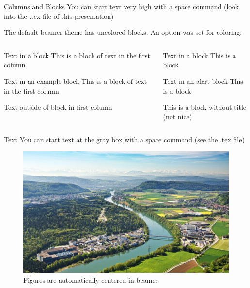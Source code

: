 \documentclass[aspectratio=169]{beamer}
\begin{document}
\begin{frame}{Columns and Blocks}
  You can start text very high with a space command (look into the .tex file of this presentation)

 The default beamer theme has uncolored blocks. An option was set for coloring: 
  \begin{columns}
    \begin{column}[T]{0.6\linewidth}
      \begin{block}{Text in a block}
        This is a block of text in the first column
      \end{block}
      \begin{exampleblock}{Text in an example block}
        This is a block of text in the first column
      \end{exampleblock}
      Text outside of block in first column
    \end{column}
    \begin{column}[T]{0.4\linewidth}
      \begin{block}{Text in a block}
        This is a block 
      \end{block}
      \begin{alertblock}{Text in an alert block}
        This is a block
      \end{alertblock}
      \begin{block}{}
        This is a block without title (not nice)
      \end{block}
    \end{column}
  \end{columns}
    
    \PSIfill
 \end{frame}
 

 \begin{frame}{Text}
   \PSIvspace
  You can start text at the gray box with a space command (see the .tex file)
  \begin{figure}
    \includegraphics[width=0.3\pagewidth]{PSIlandscape43}
    \caption{Figures are automatically centered in beamer}
    \label{fig:PSI}
    \end{figure}

     \PSIfill
\end{frame}
\end{document}
